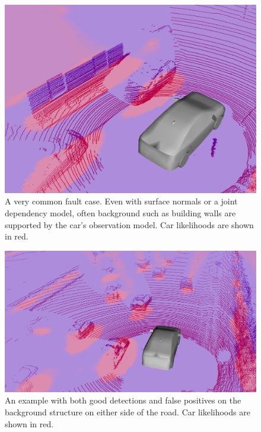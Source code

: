 \begin{figure}[!t]
  \includegraphics[width=\columnwidth]{figures/ex2.jpg}
  \caption{A very common fault case. Even with surface normals or a joint
    dependency model, often background such as building walls are supported by
    the car's  observation model. Car likelihoods are shown in red.}
  \label{fig:ex2}
\end{figure}

\begin{figure}[!t]
  \includegraphics[width=\columnwidth]{figures/ex3.jpg}
  \caption{An example with both good detections and false positives on the
    background structure on either side of the road. Car likelihoods are shown
    in red.}
  \label{fig:ex3}
\end{figure}
